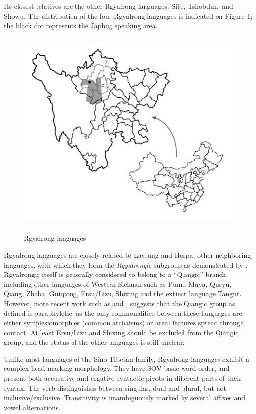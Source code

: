 \documentclass[oldfontcommands,twoside,a4paper,12pt]{article}
\begin{document}
Its closest relatives are the other Rgyalrong languages: Situ, Tshobdun, and Showu. The distribution of the four Rgyalrong languages is indicated on Figure 1; the black dot represents the Japhug speaking area.
\begin{figure}[h]
\centering \label{figure:map1}
\includegraphics[height=100mm]{carte.JPG}
\caption{Rgyalrong languages}
\label{fig:rgyalrong}
\end{figure}
 

Rgyalrong languages are closely related to Lavrung and Horpa, other neighboring languages, with which they form the \textit{Rgyalrongic} subgroup as demonstrated by \citet{jackson00sidaba}. Rgyalrongic itself is generally considered to belong to a ``Qiangic'' branch including other languages of Western Sichuan such as Pumi, Muya, Queyu, Qiang, Zhaba, Guiqiong, Ersu/Lizu, Shixing and the extinct language Tangut. However, more recent work such as \citealt{jacques.michaud11naish} and \citealt{chirkova12qiangic}, suggests that the Qiangic group as defined is paraphyletic, as the only commonalities between these languages are either symplesiomorphies (common archaisms) or areal features spread through contact. At least Ersu/Lizu and Shixing should be excluded from the Qiangic group, and the status of the other languages is still unclear.
 


Unlike most languages of the Sino-Tibetan family, Rgyalrong languages exhibit a complex head-marking morphology. They have SOV basic word order, and present both accusative and ergative syntactic pivots in different parts of their syntax. The verb distinguishes between singular, dual and plural, but not inclusive/exclusive. Transitivity is unambiguously marked by several affixes and vowel alternations. 
\end{document}
